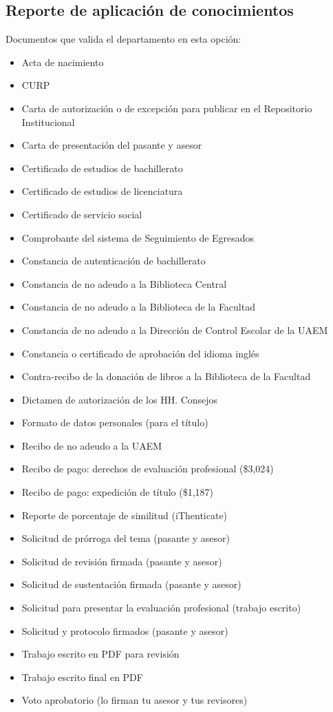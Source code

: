 \subsection{Reporte de aplicación de conocimientos}
Documentos que valida el departamento en esta opción:
\begin{itemize}
  \item Acta de nacimiento
  \item CURP
  \item Carta de autorización o de excepción para publicar en el Repositorio Institucional
  \item Carta de presentación del pasante y asesor
  \item Certificado de estudios de bachillerato
  \item Certificado de estudios de licenciatura
  \item Certificado de servicio social
  \item Comprobante del sistema de Seguimiento de Egresados
  \item Constancia de autenticación de bachillerato
  \item Constancia de no adeudo a la Biblioteca Central
  \item Constancia de no adeudo a la Biblioteca de la Facultad
  \item Constancia de no adeudo a la Dirección de Control Escolar de la UAEM
  \item Constancia o certificado de aprobación del idioma inglés
  \item Contra-recibo de la donación de libros a la Biblioteca de la Facultad
  \item Dictamen de autorización de los HH. Consejos
  \item Formato de datos personales (para el título)
  \item Recibo de no adeudo a la UAEM
  \item Recibo de pago: derechos de evaluación profesional (\$3,024)
  \item Recibo de pago: expedición de título (\$1,187)
  \item Reporte de porcentaje de similitud (iThenticate)
  \item Solicitud de prórroga del tema (pasante y asesor)
  \item Solicitud de revisión firmada (pasante y asesor)
  \item Solicitud de sustentación firmada (pasante y asesor)
  \item Solicitud para presentar la evaluación profesional (trabajo escrito)
  \item Solicitud y protocolo firmados (pasante y asesor)
  \item Trabajo escrito en PDF para revisión
  \item Trabajo escrito final en PDF
  \item Voto aprobatorio (lo firman tu asesor y tus revisores)
\end{itemize}
